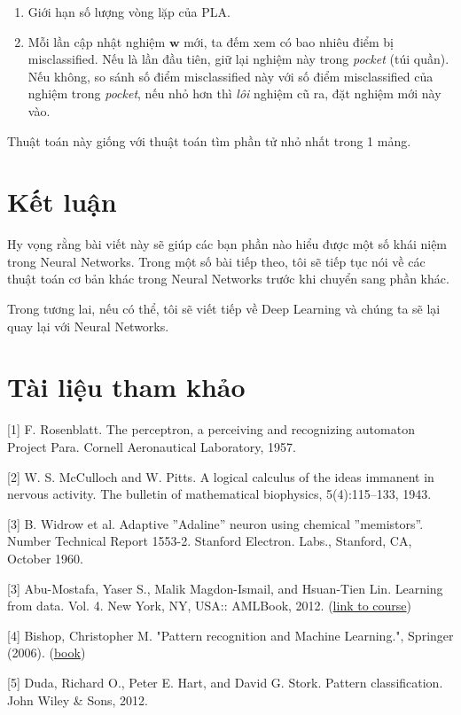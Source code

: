 \begin{enumerate}
    \item Giới hạn số lượng vòng lặp của PLA. 

    \item  Mỗi lần cập nhật nghiệm $\mathbf{w}$ mới, ta đếm xem có bao nhiêu điểm bị misclassified. Nếu là lần đầu tiên, giữ lại nghiệm này trong \textit{pocket} (túi quần). Nếu không, so sánh số điểm misclassified này với số điểm misclassified của nghiệm trong \textit{pocket}, nếu nhỏ hơn thì \textit{lôi} nghiệm cũ ra, đặt nghiệm mới này vào.  
\end{enumerate}
 
Thuật toán này giống với thuật toán tìm phần tử nhỏ nhất trong 1 mảng.  
 
 
\section{Kết luận}
 
Hy vọng rằng bài viết này sẽ giúp các bạn phần nào hiểu được một số khái niệm trong Neural Networks. Trong một số bài tiếp theo, tôi sẽ tiếp tục nói về các thuật toán cơ bản khác trong Neural Networks trước khi chuyển sang phần khác.  
 
Trong tương lai, nếu có thể, tôi sẽ viết tiếp về Deep Learning và chúng ta sẽ lại quay lại với Neural Networks. 
 
 
\section{Tài liệu tham khảo}
 
[1] F. Rosenblatt. The perceptron, a perceiving and recognizing automaton Project Para. Cornell Aeronautical Laboratory, 1957. 
 
[2] W. S. McCulloch and W. Pitts. A logical calculus of the ideas immanent in nervous activity. The bulletin of mathematical biophysics, 5(4):115–133, 1943. 
 
[3] B. Widrow et al. Adaptive ”Adaline” neuron using chemical ”memistors”. Number Technical Report 1553-2. Stanford Electron. Labs., Stanford, CA, October 1960. 
 
[3] Abu-Mostafa, Yaser S., Malik Magdon-Ismail, and Hsuan-Tien Lin. Learning from data. Vol. 4. New York, NY, USA:: AMLBook, 2012. (\href{http://work.caltech.edu/telecourse.html}{link to course}) 
 
[4] Bishop, Christopher M. "Pattern recognition and Machine Learning.", Springer  (2006). (\href{http://users.isr.ist.utl.pt/~wurmd/Livros/school/Bishop%20-%20Pattern%20Recognition%20And%20Machine%20Learning%20-%20Springer%20%202006.pdf}{book}) 
 
[5] Duda, Richard O., Peter E. Hart, and David G. Stork. Pattern classification. John Wiley \& Sons, 2012. 
 

